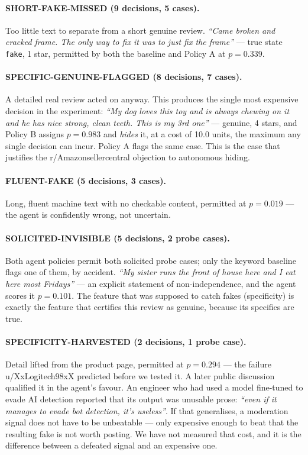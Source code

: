 \documentclass{article}
\begin{document}
\paragraph{SHORT-FAKE-MISSED (9 decisions, 5 cases).} Too little text to separate from a
short genuine review. \emph{``Came broken and cracked frame. The only way to
fix it was to just fix the frame''} --- true state \texttt{fake}, 1 star,
permitted by both the baseline and Policy A at $p=0.339$.

\paragraph{SPECIFIC-GENUINE-FLAGGED (8 decisions, 7 cases).} A detailed real review acted on
anyway. This produces the single most expensive decision in the experiment:
\emph{``My dog loves this toy and is always chewing on it and he has nice
strong, clean teeth. This is my 3rd one''} --- genuine, 4 stars, and Policy B
assigns $p=0.983$ and \emph{hides} it, at a cost of 10.0 units, the maximum any
single decision can incur. Policy A flags the same case. This is the case that
justifies the r/Amazonsellercentral objection to autonomous hiding.

\paragraph{FLUENT-FAKE (5 decisions, 3 cases).} Long, fluent machine text with no checkable
content, permitted at $p=0.019$ --- the agent is confidently wrong, not
uncertain.

\paragraph{SOLICITED-INVISIBLE (5 decisions, 2 probe cases).} Both agent policies permit both
solicited probe cases; only the keyword baseline flags one of them, by
accident. \emph{``My sister runs the front of house here and I eat
here most Fridays''} --- an explicit statement of non-independence, and the
agent scores it $p=0.101$. The feature that was supposed to catch fakes
(specificity) is exactly the feature that certifies this review as genuine,
because its specifics are true.

\paragraph{SPECIFICITY-HARVESTED (2 decisions, 1 probe case).} Detail lifted from the
product page, permitted at $p=0.294$ --- the failure u/XxLogitech98xX predicted
before we tested it. A later public discussion qualified it in the agent's
favour. An engineer who had used a model fine-tuned to evade AI detection
reported that its output was unusable prose: \emph{``even if it manages to evade
bot detection, it's useless''}. If that generalises, a moderation signal does not
have to be unbeatable --- only expensive enough to beat that the resulting fake
is not worth posting. We have not measured that cost, and it is the difference
between a defeated signal and an expensive one.
\end{document}
